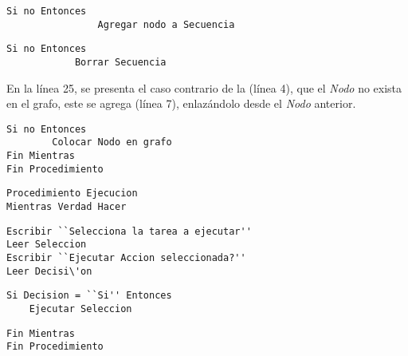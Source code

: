 \begin{tiny}
\begin{lstlisting}[style=C]            
            Si no Entonces
                Agregar nodo a Secuencia
\end{lstlisting}
\end{tiny}



\begin{tiny}
\begin{lstlisting}[style=C]		
		Si no Entonces
            Borrar Secuencia
\end{lstlisting}
\end{tiny}


En la l\'inea 25, se presenta el caso contrario de la (l\'inea 4), que el \emph{Nodo} no exista en el grafo, este se agrega (l\'inea 7), enlaz\'andolo desde el \emph{Nodo} anterior.


\begin{tiny}
\begin{lstlisting}[style=C]
    Si no Entonces
        Colocar Nodo en grafo
Fin Mientras
Fin Procedimiento 
\end{lstlisting}
\end{tiny}



\begin{tiny}
\begin{lstlisting}[style=C]
Procedimiento Ejecucion
Mientras Verdad Hacer
\end{lstlisting}
\end{tiny}



\begin{tiny}
\begin{lstlisting}[style=C]
Escribir ``Selecciona la tarea a ejecutar''
Leer Seleccion
Escribir ``Ejecutar Accion seleccionada?''
Leer Decisi\'on
\end{lstlisting}
\end{tiny}



\begin{tiny}
\begin{lstlisting}[style=C]
Si Decision = ``Si'' Entonces
	Ejecutar Seleccion
\end{lstlisting}
\end{tiny}



\begin{tiny}
\begin{lstlisting}[style=C]
Fin Mientras
Fin Procedimiento
\end{lstlisting}
\end{tiny}

